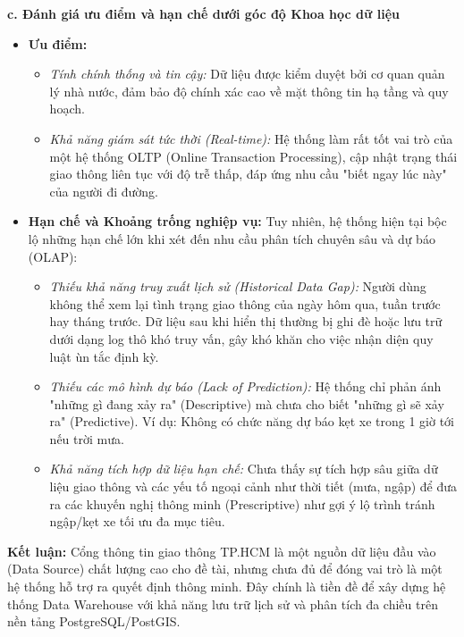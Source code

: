 \textbf{c. Đánh giá ưu điểm và hạn chế dưới góc độ Khoa học dữ liệu}

\begin{itemize}
    \item \textbf{Ưu điểm:}
    \begin{itemize}
        \item \textit{Tính chính thống và tin cậy:} Dữ liệu được kiểm duyệt bởi cơ quan quản lý nhà nước, đảm bảo độ chính xác cao về mặt thông tin hạ tầng và quy hoạch.
        \item \textit{Khả năng giám sát tức thời (Real-time):} Hệ thống làm rất tốt vai trò của một hệ thống OLTP (Online Transaction Processing), cập nhật trạng thái giao thông liên tục với độ trễ thấp, đáp ứng nhu cầu "biết ngay lúc này" của người đi đường.
    \end{itemize}

    \item \textbf{Hạn chế và Khoảng trống nghiệp vụ:} Tuy nhiên, hệ thống hiện tại bộc lộ những hạn chế lớn khi xét đến nhu cầu phân tích chuyên sâu và dự báo (OLAP):
    \begin{itemize}
        \item \textit{Thiếu khả năng truy xuất lịch sử (Historical Data Gap):} Người dùng không thể xem lại tình trạng giao thông của ngày hôm qua, tuần trước hay tháng trước. Dữ liệu sau khi hiển thị thường bị ghi đè hoặc lưu trữ dưới dạng log thô khó truy vấn, gây khó khăn cho việc nhận diện quy luật ùn tắc định kỳ.
        \item \textit{Thiếu các mô hình dự báo (Lack of Prediction):} Hệ thống chỉ phản ánh "những gì đang xảy ra" (Descriptive) mà chưa cho biết "những gì sẽ xảy ra" (Predictive). Ví dụ: Không có chức năng dự báo kẹt xe trong 1 giờ tới nếu trời mưa.
        \item \textit{Khả năng tích hợp dữ liệu hạn chế:} Chưa thấy sự tích hợp sâu giữa dữ liệu giao thông và các yếu tố ngoại cảnh như thời tiết (mưa, ngập) để đưa ra các khuyến nghị thông minh (Prescriptive) như gợi ý lộ trình tránh ngập/kẹt xe tối ưu đa mục tiêu.
    \end{itemize}
\end{itemize}

\textbf{Kết luận:} Cổng thông tin giao thông TP.HCM là một nguồn dữ liệu đầu vào (Data Source) chất lượng cao cho đề tài, nhưng chưa đủ để đóng vai trò là một hệ thống hỗ trợ ra quyết định thông minh. Đây chính là tiền đề để xây dựng hệ thống Data Warehouse với khả năng lưu trữ lịch sử và phân tích đa chiều trên nền tảng PostgreSQL/PostGIS.

